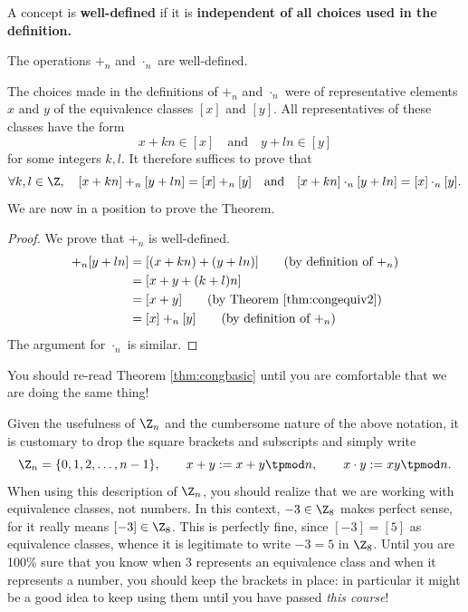 \begin{defn}\label{defn:well}
A concept is \textbf{well-defined} if it is \textbf{independent of all choices used in the definition.}
\end{defn}

\begin{thm}\label{thm:congwd}
The operations $+_n$ and $\cdot_n$ are well-defined.
\end{thm}

\noindent The choices made in the definitions of $+_n$ and $\cdot_n$ were of representative elements $x$ and $y$ of the equivalence classes $[x]$ and $[y]$. All representatives of these classes have the form
\[x+kn\in[x]\quad\text{and}\quad y+ln\in[y]\]
for some integers $k,l$. It therefore suffices to prove that
\[\forall k,l\in\Z,\quad [x+kn]+_n[y+ln]=[x]+_n[y]\quad\text{and}\quad [x+kn]\cdot_n[y+ln]=[x]\cdot_n[y].\]
We are now in a position to prove the Theorem.

\begin{proof}
We prove that $+_n$ is well-defined.
\begin{align*}
[x+kn]+_n[y+ln]&=[(x+kn)+(y+ln)]\tag*{(by definition of $+_n$)}\\
&=[x+y+(k+l)n]\\
&=[x+y]\tag*{(by Theorem \ref{thm:congequiv2})}\\
&=[x]+_n[y]\tag*{(by definition of $+_n$)}
\end{align*}
The argument for $\cdot_n$ is similar.
\end{proof}

\noindent You should re-read Theorem \ref{thm:congbasic} until you are comfortable that we are doing the same thing!\\

\begin{aside}

Given the usefulness of $\Z_n$ and the cumbersome nature of the above notation, it is customary to drop the square brackets and subscripts and simply write
\[\Z_n=\{0,1,2,\ldots,n-1\},\qquad x+y:=x+y\tpmod n,\qquad x\cdot y:=xy\tpmod n.\]
When using this description of $\Z_n$, you should realize that we are working with equivalence classes, not numbers. In this context, $-3\in\Z_8$ makes perfect sense, for it really means $[-3]\in\Z_8$. This is perfectly fine, since $[-3]=[5]$ as equivalence classes, whence it is legitimate to write $-3=5$ in $\Z_8$. Until you are 100\% sure that you know when 3 represents an equivalence class and when it represents a number, you should keep the brackets in place: in particular it might be a good idea to keep using them until you have passed \emph{this course}!
\end{aside}


